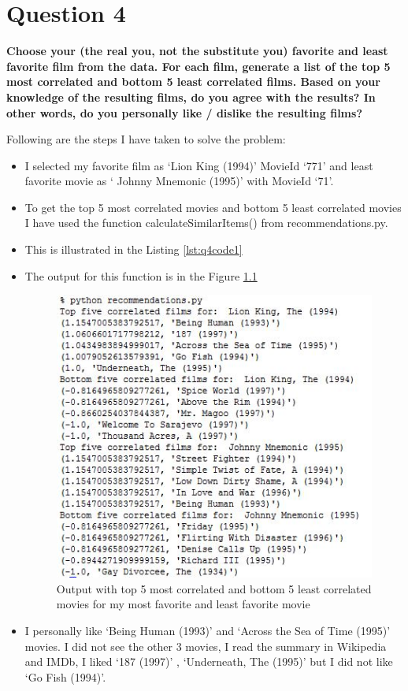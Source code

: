 \chapter{Question 4}
\label{available-representation}

\textbf{Choose your (the real you, not the substitute you) favorite and least favorite film from the data.  For each film, generate a list of the top 5 most correlated and bottom 5 least correlated films. Based on your knowledge of the resulting films, do you agree with the results?  In other words, do you personally like / dislike the resulting films?}

Following are the steps I have taken to solve the problem:

\begin{itemize}
\item I selected my favorite film as `Lion King (1994)' Movie\textunderscore Id `771' and least favorite movie as ` Johnny Mnemonic (1995)' with Movie\textunderscore Id `71'.
\item To get the top 5 most correlated movies and bottom 5 least correlated movies I have used the function calculateSimilarItems() from recommendations.py.
\item This is illustrated in the Listing \ref{lst:q4code1}
\item The output for this function is in the Figure \ref{fig:q4fig1}
\begin{figure}[h!]
\begin{center}
\hspace*{-3cm} 
\includegraphics[scale=0.55, keepaspectratio=true]{figures/1.JPG}
\caption{Output with top 5 most correlated and bottom 5 least correlated movies for my most favorite and least favorite movie}
\label{fig:q4fig1}
\end{center}
\end{figure}
\item I personally like `Being Human (1993)' and `Across the Sea of Time (1995)' movies. I did not see the other 3 movies, I read the  summary in Wikipedia and IMDb, I liked `187 (1997)' , `Underneath, The (1995)' but I did not like `Go Fish (1994)'.
\end {itemize}


